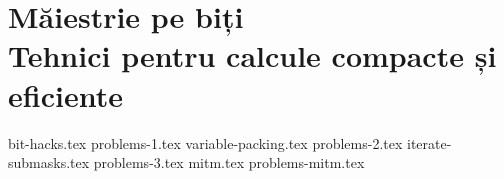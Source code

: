 \part[Măiestrie pe biți]{Măiestrie pe biți\\[\bigskipamount]
  \large Tehnici pentru calcule compacte și eficiente}

{bit-hacks.tex}
{problems-1.tex}
{variable-packing.tex}
{problems-2.tex}
{iterate-submasks.tex}
{problems-3.tex}
{mitm.tex}
{problems-mitm.tex}
